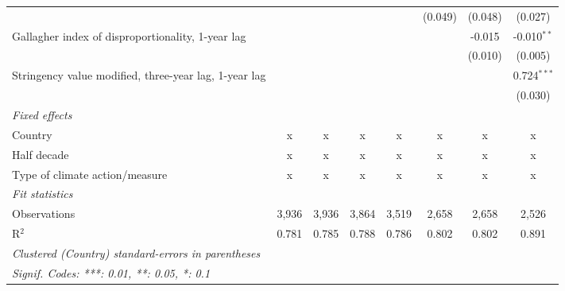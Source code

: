 \begin{table}[htbp]
\begin{tabular}{lccccccc}
                                                            &         &              &              &              & (0.049)       & (0.048)       & (0.027)\\   
      Gallagher index of disproportionality, 1-year lag     &         &              &              &              &               & -0.015        & -0.010$^{**}$\\   
                                                            &         &              &              &              &               & (0.010)       & (0.005)\\   
      Stringency value modified, three-year lag, 1-year lag &         &              &              &              &               &               & 0.724$^{***}$\\   
                                                            &         &              &              &              &               &               & (0.030)\\   
      \emph{Fixed effects}\\
      Country                                               & x       & x            & x            & x            & x             & x             & x\\  
      Half decade                                           & x       & x            & x            & x            & x             & x             & x\\  
      Type of climate action/measure                        & x       & x            & x            & x            & x             & x             & x\\  
      \midrule \emph{Fit statistics}\\
      Observations                                          & 3,936   & 3,936        & 3,864        & 3,519        & 2,658         & 2,658         & 2,526\\  
      R$^2$                                                 & 0.781   & 0.785        & 0.788        & 0.786        & 0.802         & 0.802         & 0.891\\  
      \midrule
      \multicolumn{8}{l}{\emph{Clustered (Country) standard-errors in parentheses}}\\
      \multicolumn{8}{l}{\emph{Signif. Codes: ***: 0.01, **: 0.05, *: 0.1}}\\
   \end{tabular}
\end{table}


